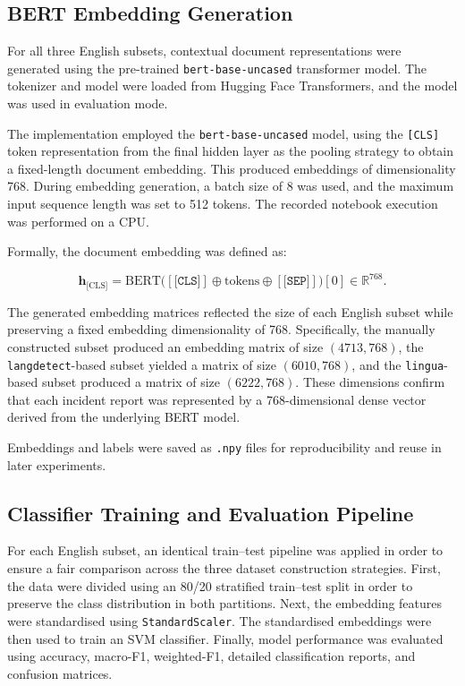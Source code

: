 \documentclass[11pt, titlepage, bibliography=totoc]{scrreprt}
\begin{document}
\subsection{BERT Embedding Generation}

For all three English subsets, contextual document representations were generated using the pre-trained \texttt{bert-base-uncased} transformer model. The tokenizer and model were loaded from Hugging Face Transformers, and the model was used in evaluation mode.

The implementation employed the \texttt{bert-base-uncased} model, using the \texttt{[CLS]} token representation from the final hidden layer as the pooling strategy to obtain a fixed-length document embedding. This produced embeddings of dimensionality 768. During embedding generation, a batch size of 8 was used, and the maximum input sequence length was set to 512 tokens. The recorded notebook execution was performed on a CPU.

Formally, the document embedding was defined as:

\begin{equation}
\mathbf{h}_{\text{[CLS]}} = \text{BERT}\big([\texttt{[CLS]}] \oplus \text{tokens} \oplus [\texttt{[SEP]}]\big)[0] \in \mathbb{R}^{768}.
\end{equation}

The generated embedding matrices reflected the size of each English subset while preserving a fixed embedding dimensionality of 768. Specifically, the manually constructed subset produced an embedding matrix of size $(4713, 768)$, the \texttt{langdetect}-based subset yielded a matrix of size $(6010, 768)$, and the \texttt{lingua}-based subset produced a matrix of size $(6222, 768)$. These dimensions confirm that each incident report was represented by a 768-dimensional dense vector derived from the underlying BERT model.

Embeddings and labels were saved as \texttt{.npy} files for reproducibility and reuse in later experiments.

\subsection{Classifier Training and Evaluation Pipeline}

For each English subset, an identical train--test pipeline was applied in order to ensure a fair comparison across the three dataset construction strategies. First, the data were divided using an 80/20 stratified train--test split in order to preserve the class distribution in both partitions. Next, the embedding features were standardised using \texttt{StandardScaler}. The standardised embeddings were then used to train an SVM classifier. Finally, model performance was evaluated using accuracy, macro-F1, weighted-F1, detailed classification reports, and confusion matrices.
\end{document}
